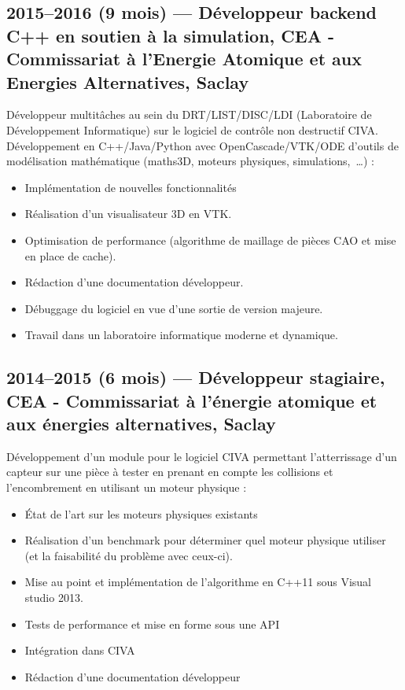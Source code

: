 \documentclass[11pt,a4paper,sans]{article} %
\begin{document}
\subsection{2015--2016 (9 mois) --- Développeur backend C++ en soutien à la simulation, CEA - Commissariat à l'Energie
  Atomique et aux Energies Alternatives, Saclay}
Développeur multitâches au sein du DRT/LIST/DISC/LDI (Laboratoire de Développement Informatique) sur le logiciel de
contrôle non destructif CIVA.
Développement en C++/Java/Python avec OpenCascade/VTK/ODE d'outils de modélisation mathématique (maths3D, moteurs
physiques, simulations,~\ldots) :
\begin{itemize}
  \item Implémentation de nouvelles fonctionnalités
  \item Réalisation d'un visualisateur 3D en VTK.
  \item Optimisation de performance (algorithme de maillage de pièces CAO et mise en place de cache).
  \item Rédaction d'une documentation développeur.
  \item Débuggage du logiciel en vue d'une sortie de version majeure.
  \item Travail dans un laboratoire informatique moderne et dynamique.
\end{itemize}

\subsection{2014--2015 (6 mois) --- Développeur stagiaire, CEA - Commissariat à l'énergie atomique et aux énergies
  alternatives, Saclay}
Développement d'un module pour le logiciel CIVA permettant l'atterrissage d'un capteur sur une pièce à tester en prenant
en compte les collisions et l'encombrement en utilisant un moteur physique :
\begin{itemize}
  \item \'{E}tat de l'art sur les moteurs physiques existants
  \item Réalisation d'un benchmark pour déterminer quel moteur physique utiliser (et la faisabilité du problème avec
        ceux-ci).
  \item Mise au point et implémentation de l'algorithme en C++11 sous Visual studio 2013.
  \item Tests de performance et mise en forme sous une API
  \item Intégration dans CIVA
  \item Rédaction d'une documentation développeur
\end{itemize}
\end{document}
